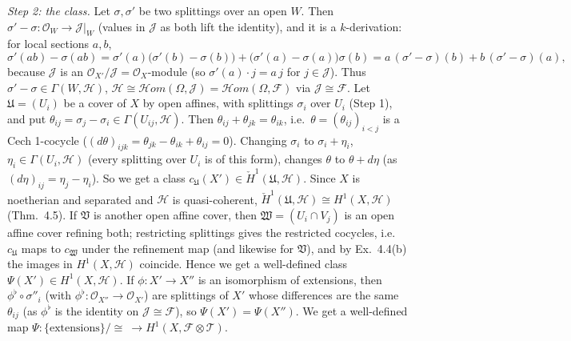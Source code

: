 \documentclass[11pt]{article}
\begin{document}
\emph{Step 2: the class.} Let $\sigma,\sigma'$ be two splittings over an open $W$. Then $\sigma'-\sigma:\mathcal O_W\to\mathcal J|_W$ (values in $\mathcal J$ as both lift the identity), and it is a $k$-derivation: for local sections $a,b$,
\[
\sigma'(ab)-\sigma(ab)=\sigma'(a)\big(\sigma'(b)-\sigma(b)\big)+\big(\sigma'(a)-\sigma(a)\big)\sigma(b)=a\,(\sigma'-\sigma)(b)+b\,(\sigma'-\sigma)(a),
\]
because $\mathcal J$ is an $\mathcal O_{X'}/\mathcal J=\mathcal O_X$-module (so $\sigma'(a)\cdot j=a\,j$ for $j\in\mathcal J$). Thus $\sigma'-\sigma\in\Gamma(W,\mathcal H)$, $\mathcal H\cong\mathcal Hom(\Omega,\mathcal J)=\mathcal Hom(\Omega,\mathcal F)$ via $\mathcal J\cong\mathcal F$. Let $\mathfrak U=(U_i)$ be a cover of $X$ by open affines, with splittings $\sigma_i$ over $U_i$ (Step 1), and put $\theta_{ij}=\sigma_j-\sigma_i\in\Gamma(U_{ij},\mathcal H)$. Then $\theta_{ij}+\theta_{jk}=\theta_{ik}$, i.e.\ $\theta=(\theta_{ij})_{i<j}$ is a Cech 1-cocycle ($(d\theta)_{ijk}=\theta_{jk}-\theta_{ik}+\theta_{ij}=0$). Changing $\sigma_i$ to $\sigma_i+\eta_i$, $\eta_i\in\Gamma(U_i,\mathcal H)$ (every splitting over $U_i$ is of this form), changes $\theta$ to $\theta+d\eta$ (as $(d\eta)_{ij}=\eta_j-\eta_i$). So we get a class $c_{\mathfrak U}(X')\in\check H^1(\mathfrak U,\mathcal H)$. Since $X$ is noetherian and separated and $\mathcal H$ is quasi-coherent, $\check H^1(\mathfrak U,\mathcal H)\cong H^1(X,\mathcal H)$ (Thm.~4.5). If $\mathfrak V$ is another open affine cover, then $\mathfrak W=(U_i\cap V_j)$ is an open affine cover refining both; restricting splittings gives the restricted cocycles, i.e.\ $c_{\mathfrak U}$ maps to $c_{\mathfrak W}$ under the refinement map (and likewise for $\mathfrak V$), and by Ex.~4.4(b) the images in $H^1(X,\mathcal H)$ coincide. Hence we get a well-defined class $\Psi(X')\in H^1(X,\mathcal H)$. If $\phi:X'\to X''$ is an isomorphism of extensions, then $\phi^\flat\circ\sigma''_i$ (with $\phi^\flat:\mathcal O_{X''}\to\mathcal O_{X'}$) are splittings of $X'$ whose differences are the same $\theta_{ij}$ (as $\phi^\flat$ is the identity on $\mathcal J\cong\mathcal F$), so $\Psi(X')=\Psi(X'')$. We get a well-defined map $\Psi:\{\text{extensions}\}/\!\cong\ \to H^1(X,\mathcal F\otimes\mathcal T)$.
\end{document}
